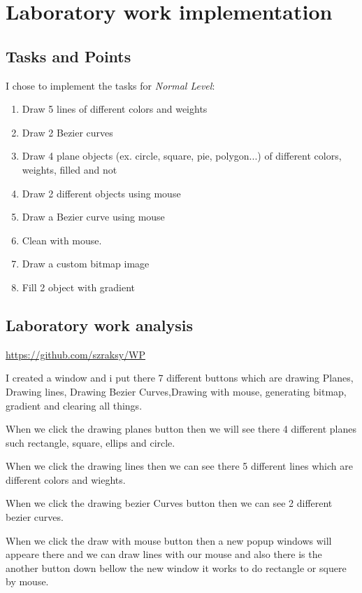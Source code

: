 \section{Laboratory work implementation}

\subsection{Tasks and Points}

I chose to implement the tasks for \textit{Normal Level}:
\begin{enumerate}
	\item Draw 5 lines of different colors and weights
	\item	Draw 2 Bezier curves
	\item	Draw 4 plane objects (ex. circle, square, pie, polygon...) of different colors, weights, filled and not
	\item	Draw 2 different objects using mouse
\item	Draw a Bezier curve using mouse
\item Clean with mouse.
\item Draw a custom bitmap image
\item Fill 2 object with gradient
\end{enumerate}

\subsection{Laboratory work analysis}

 \url{https://github.com/szraksy/WP}

I created a window and i put there 7 different buttons which are drawing Planes, Drawing lines, Drawing Bezier Curves,Drawing with mouse, generating bitmap, gradient and clearing all things.

When we click the drawing planes button then we will see there 4 different planes such rectangle, square, ellips and circle.

When we click the drawing lines then we can see there 5 different lines which are different colors and wieghts.

When we click the drawing bezier Curves button then we can see 2 different bezier curves.


When we click the draw with mouse button then a new popup windows will appeare there and we can draw lines with our mouse and also there is the another button down bellow the new window it works to do rectangle or squere by mouse.

